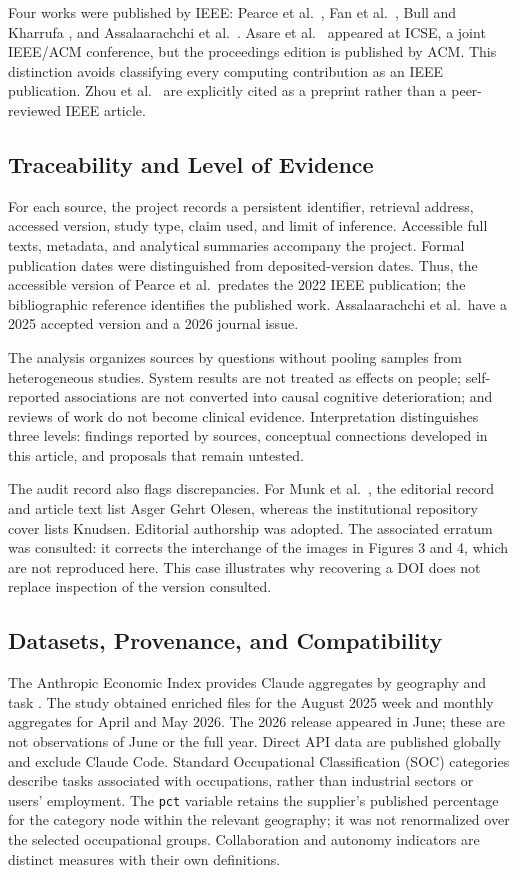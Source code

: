 \documentclass[11pt,a4paper]{article}
\begin{document}
Four works were published by IEEE: Pearce et al.\ \cite{pearce}, Fan et al.\ \cite{fan}, Bull and Kharrufa \cite{educacao}, and Assalaarachchi et al.\ \cite{gestao}. Asare et al.\ \cite{asare} appeared at ICSE, a joint IEEE/ACM conference, but the proceedings edition is published by ACM. This distinction avoids classifying every computing contribution as an IEEE publication. Zhou et al.\ \cite{zhou} are explicitly cited as a preprint rather than a peer-reviewed IEEE article.

\subsection{Traceability and Level of Evidence}
For each source, the project records a persistent identifier, retrieval address, accessed version, study type, claim used, and limit of inference. Accessible full texts, metadata, and analytical summaries accompany the project. Formal publication dates were distinguished from deposited-version dates. Thus, the accessible version of Pearce et al.\ predates the 2022 IEEE publication; the bibliographic reference identifies the published work. Assalaarachchi et al.\ have a 2025 accepted version and a 2026 journal issue.

The analysis organizes sources by questions without pooling samples from heterogeneous studies. System results are not treated as effects on people; self-reported associations are not converted into causal cognitive deterioration; and reviews of work do not become clinical evidence. Interpretation distinguishes three levels: findings reported by sources, conceptual connections developed in this article, and proposals that remain untested.

The audit record also flags discrepancies. For Munk et al.\ \cite{munk}, the editorial record and article text list Asger Gehrt Olesen, whereas the institutional repository cover lists Knudsen. Editorial authorship was adopted. The associated erratum was consulted: it corrects the interchange of the images in Figures 3 and 4, which are not reproduced here. This case illustrates why recovering a DOI does not replace inspection of the version consulted.

\subsection{Datasets, Provenance, and Compatibility}
The Anthropic Economic Index provides Claude aggregates by geography and task \cite{aei2025,aei2026}. The study obtained enriched files for the August 2025 week and monthly aggregates for April and May 2026. The 2026 release appeared in June; these are not observations of June or the full year. Direct API data are published globally and exclude Claude Code. Standard Occupational Classification (SOC) categories describe tasks associated with occupations, rather than industrial sectors or users' employment. The \texttt{pct} variable retains the supplier's published percentage for the category node within the relevant geography; it was not renormalized over the selected occupational groups. Collaboration and autonomy indicators are distinct measures with their own definitions.
\end{document}
